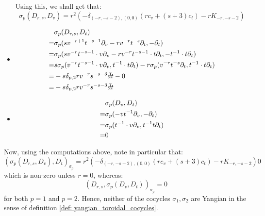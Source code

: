 \begin{example}
\begin{itemize}
                Using this, we shall get that:
                    $$\sigma_p(D_{r, s}, D_v) = r^2 \left( -\delta_{(-r, -s - 2), (0, 0)} ( r c_v + (s + 3) c_t ) - r K_{-r, -s - 2} \right)$$
                \item
                    $$
                        \begin{aligned}
                            & \sigma_p(D_{r, s}, D_t)
                            \\
                            = & \sigma_p( s v^{-r + 1} t^{-s - 1} \partial_v - r v^{-r} t^{-s} \partial_t, -\partial_t )
                            \\
                            = & \sigma_p( s v^{-r} t^{-s - 1} \cdot v \partial_v - r v^{-r} t^{-s - 1} \cdot t \partial_t, -t^{-1} \cdot t\partial_t )
                            \\
                            = & s \sigma_p( v^{-r} t^{-s - 1} \cdot v \partial_v, t^{-1} \cdot t\partial_t ) - r\sigma_p( v^{-r} t^{-s} \partial_t, t^{-1} \cdot t\partial_t )
                            \\
                            = & -s \delta_{p, 2} r v^{-r} s^{-s - 3} \bar{d}t - 0
                            \\
                            = & -s \delta_{p, 2} r v^{-r} s^{-s - 3} \bar{d}t
                        \end{aligned}
                    $$
                \item
                    $$
                        \begin{aligned}
                            & \sigma_p(D_v, D_t)
                            \\
                            = & \sigma_p(-v t^{-1} \partial_v, -\partial_t)
                            \\
                            = & \sigma_p(t^{-1} \cdot v \partial_v, t^{-1} t \partial_t)
                            \\
                            = & 0
                        \end{aligned}
                    $$
            \end{itemize}

            Now, using the computations above, note in particular that:
                $$( \sigma_p(D_{r, s}, D_v), D_t )_{\sigma_p} = r^2 \left( -\delta_{(-r, -s - 2), (0, 0)} ( r c_v + (s + 3) c_t ) - r K_{-r, -s - 2} \right)0$$
            which is non-zero unless $r = 0$, whereas:
                $$( D_{r, s}, \sigma_p(D_v, D_t) )_{\sigma_p} = 0$$
            for both $p = 1$ and $p = 2$. Hence, neither of the cocycles $\sigma_1, \sigma_2$ are Yangian in the sense of definition \ref{def: yangian_toroidal_cocycles}.
        \end{example}